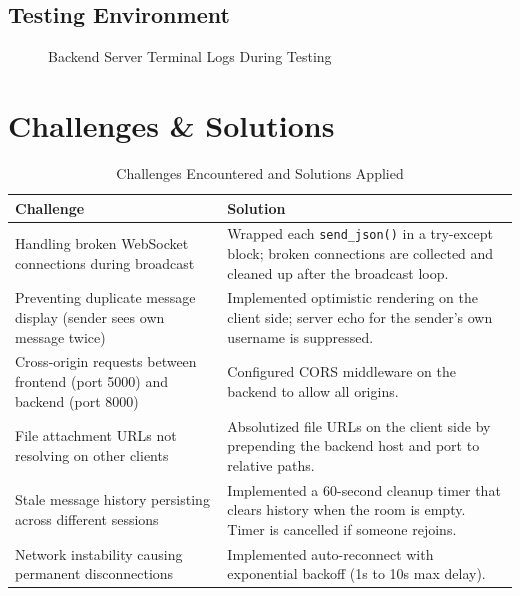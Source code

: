 \documentclass[12pt, a4paper]{article}
\begin{document}
\subsection{Testing Environment}

\begin{figure}[H]
    \centering
    \caption{Backend Server Terminal Logs During Testing}
    \label{fig:testing}
\end{figure}


\section{Challenges \& Solutions}

\begin{table}[H]
    \centering
    \caption{Challenges Encountered and Solutions Applied}
    \begin{tabularx}{\textwidth}{X X}
        \toprule
        \textbf{Challenge} & \textbf{Solution} \\
        \midrule
        Handling broken WebSocket connections during broadcast &
        Wrapped each \texttt{send\_json()} in a try-except block; broken connections are collected and cleaned up after the broadcast loop. \\
        \midrule
        Preventing duplicate message display (sender sees own message twice) &
        Implemented optimistic rendering on the client side; server echo for the sender's own username is suppressed. \\
        \midrule
        Cross-origin requests between frontend (port 5000) and backend (port 8000) &
        Configured CORS middleware on the backend to allow all origins. \\
        \midrule
        File attachment URLs not resolving on other clients &
        Absolutized file URLs on the client side by prepending the backend host and port to relative paths. \\
        \midrule
        Stale message history persisting across different sessions &
        Implemented a 60-second cleanup timer that clears history when the room is empty. Timer is cancelled if someone rejoins. \\
        \midrule
        Network instability causing permanent disconnections &
        Implemented auto-reconnect with exponential backoff (1s to 10s max delay). \\
        \bottomrule
    \end{tabularx}
\end{table}
\end{document}
